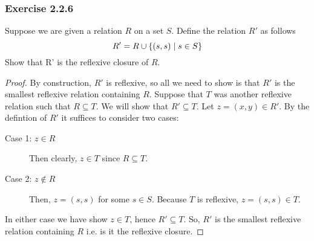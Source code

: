 

\titlespacing{\subsubsection}{0pt}{\parskip}{-\parskip}



\subsubsection*{Exercise 2.2.6}
Suppose we are given a relation $R$ on a set $S$. Define the relation $R'$ as follows 
\[
    R' = R \cup \{(s, s)\mid s \in S\}
\]
Show that R' is the reflexive closure of $R$.
\begin{proof}
    By construction, $R'$ is reflexive, so all we need to show is that $R'$ is the smallest reflexive
    relation containing $R$.  Suppose that $T$ was another reflexive relation such that $R \subseteq T$.
    We will show that $R' \subseteq T$.  Let $z = (x, y) \in R'$.  By the defintion of $R'$ it suffices to  consider two cases:
    \begin{description}
        \item[Case 1: $z \in R$] Then clearly, $z \in T$ since $R \subseteq T$.
        \item[Case 2: $z \notin R$] Then, $z = (s, s)$ for some $s \in S$.  Because $T$ is reflexive, $z = (s, s) \in T$.  
    \end{description}

    In either case we have show $z \in T$, hence $R' \subseteq T$. So, $R'$ is the smallest reflexive relation containing $R$ i.e. is it the reflexive closure.
\end{proof}

